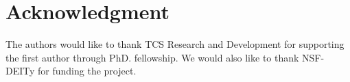 \documentclass[conference]{IEEEtran}
\begin{document}


\section*{Acknowledgment}


The authors would like to thank TCS Research and Development for supporting the first author through PhD. fellowship. We would also like to thank NSF- DEITy for funding the project.







%
%
%



\end{document}
